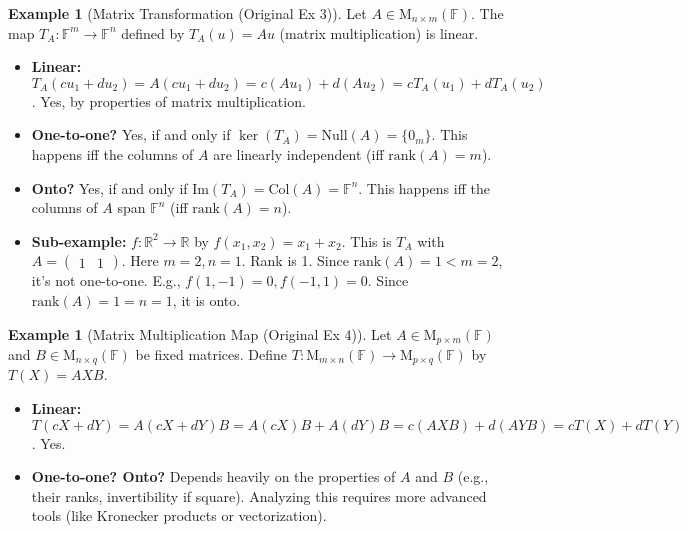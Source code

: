\documentclass[11pt]{article}
\theoremstyle{definition}
\newtheorem{example}[theorem]{Example}
\theoremstyle{remark}
\newcommand{\F}{\mathbb{F}}
\newcommand{\R}{\mathbb{R}}
\newcommand{\M}[2]{\mathrm{M}_{#1 \times #2}} %
\newcommand{\Rn}[1]{\R^{#1}}
\newcommand{\Fn}[1]{\F^{#1}}
\newcommand{\img}{\mathrm{Im}} %
\newcommand{\nul}{\mathrm{Null}} %
\newcommand{\col}{\mathrm{Col}} %
\newcommand{\rank}{\mathrm{rank}}
\begin{document}
\begin{example}[Matrix Transformation (Original Ex 3)]
    Let $A \in \M{n}{m}(\F)$. The map $T_A: \Fn{m} \to \Fn{n}$ defined by $T_A(u) = Au$ (matrix multiplication) is linear.
    \begin{itemize}
        \item \textbf{Linear:} $T_A(c u_1 + d u_2) = A(c u_1 + d u_2) = c(Au_1) + d(Au_2) = c T_A(u_1) + d T_A(u_2)$. Yes, by properties of matrix multiplication.
        \item \textbf{One-to-one?} Yes, if and only if $\ker(T_A) = \nul(A) = \{0_m\}$. This happens iff the columns of $A$ are linearly independent (iff $\rank(A) = m$).
        \item \textbf{Onto?} Yes, if and only if $\img(T_A) = \col(A) = \Fn{n}$. This happens iff the columns of $A$ span $\Fn{n}$ (iff $\rank(A) = n$).
        \item \textbf{Sub-example:} $f: \Rn{2} \to \R$ by $f(x_1, x_2) = x_1 + x_2$. This is $T_A$ with $A = \begin{pmatrix} 1 & 1 \end{pmatrix}$.
            Here $m=2, n=1$. Rank is 1.
            Since $\rank(A) = 1 < m=2$, it's not one-to-one. E.g., $f(1,-1)=0, f(-1,1)=0$.
            Since $\rank(A) = 1 = n=1$, it is onto.
    \end{itemize}
\end{example}

\begin{example}[Matrix Multiplication Map (Original Ex 4)]
    Let $A \in \M{p}{m}(\F)$ and $B \in \M{n}{q}(\F)$ be fixed matrices. Define $T: \M{m}{n}(\F) \to \M{p}{q}(\F)$ by $T(X) = AXB$.
    \begin{itemize}
        \item \textbf{Linear:} $T(cX + dY) = A(cX+dY)B = A(cX)B + A(dY)B = c(AXB) + d(AYB) = cT(X) + dT(Y)$. Yes.
        \item \textbf{One-to-one? Onto?} Depends heavily on the properties of $A$ and $B$ (e.g., their ranks, invertibility if square). Analyzing this requires more advanced tools (like Kronecker products or vectorization).
    \end{itemize}
\end{example}
\end{document}
